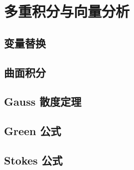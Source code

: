 \section{多重积分与向量分析}
\label{b2:sec:0102}


\subsection{变量替换}
\label{b2:subsec:010201}

\subsection{曲面积分}
\label{b2:subsec:010202}

\subsection{Gauss 散度定理}
\label{b2:subsec:010203}

\subsection{Green 公式}
\label{b2:subsec:010204}

\subsection{Stokes 公式}
\label{b2:subsec:010205}


